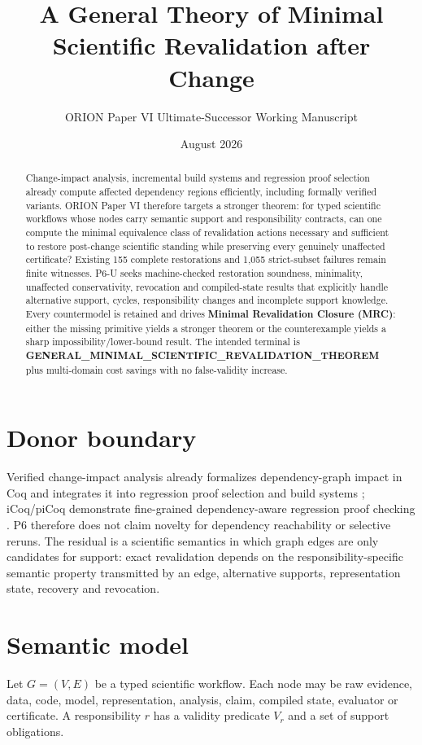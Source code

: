\documentclass[11pt]{article}
\title{A General Theory of Minimal Scientific Revalidation after Change}
\author{ORION Paper VI Ultimate-Successor Working Manuscript}
\date{August 2026}
\begin{document}
\maketitle

\begin{abstract}
Change-impact analysis, incremental build systems and regression proof selection already compute affected dependency regions efficiently, including formally verified variants. ORION Paper VI therefore targets a stronger theorem: for typed scientific workflows whose nodes carry semantic support and responsibility contracts, can one compute the minimal equivalence class of revalidation actions necessary and sufficient to restore post-change scientific standing while preserving every genuinely unaffected certificate? Existing 155 complete restorations and 1,055 strict-subset failures remain finite witnesses. P6-U seeks machine-checked restoration soundness, minimality, unaffected conservativity, revocation and compiled-state results that explicitly handle alternative support, cycles, responsibility changes and incomplete support knowledge. Every countermodel is retained and drives \textbf{Minimal Revalidation Closure (MRC)}: either the missing primitive yields a stronger theorem or the counterexample yields a sharp impossibility/lower-bound result. The intended terminal is \textbf{GENERAL\_MINIMAL\_SCIENTIFIC\_REVALIDATION\_THEOREM} plus multi-domain cost savings with no false-validity increase.
\end{abstract}

\section{Donor boundary}
Verified change-impact analysis already formalizes dependency-graph impact in Coq and integrates it into regression proof selection and build systems \cite{chip2020}; iCoq/piCoq demonstrate fine-grained dependency-aware regression proof checking \cite{icoq2018}. P6 therefore does not claim novelty for dependency reachability or selective reruns. The residual is a scientific semantics in which graph edges are only candidates for support: exact revalidation depends on the responsibility-specific semantic property transmitted by an edge, alternative supports, representation state, recovery and revocation.

\section{Semantic model}
Let $G=(V,E)$ be a typed scientific workflow. Each node may be raw evidence, data, code, model, representation, analysis, claim, compiled state, evaluator or certificate. A responsibility $r$ has a validity predicate $V_r$ and a set of support obligations.
\end{document}
